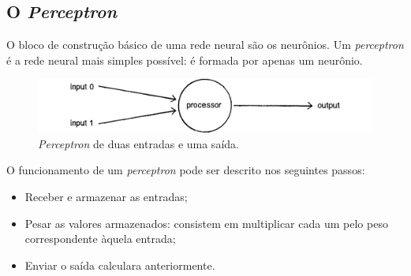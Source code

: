%

\subsection{O \textit{Perceptron}}

O bloco de construção básico de uma rede neural são os neurônios. Um \textit{perceptron} é a rede
neural mais simples possível: é formada por apenas um neurônio.

\begin{figure}[ht]
\centering
\includegraphics[width=15cm]{figuras/rede_neural_perceptron}
\caption{\textit{Perceptron} de duas entradas e uma saída.}\label{fig:rede_neural_perceptron}
\end{figure}


O funcionamento de um \textit{perceptron} pode ser descrito nos seguintes passos:

\begin{itemize}
\item
  Receber e armazenar as entradas;
\item
  Pesar as valores armazenados: consistem em multiplicar cada um pelo peso correspondente àquela entrada;
\item
  Enviar o saída calculara anteriormente.
\end{itemize}

